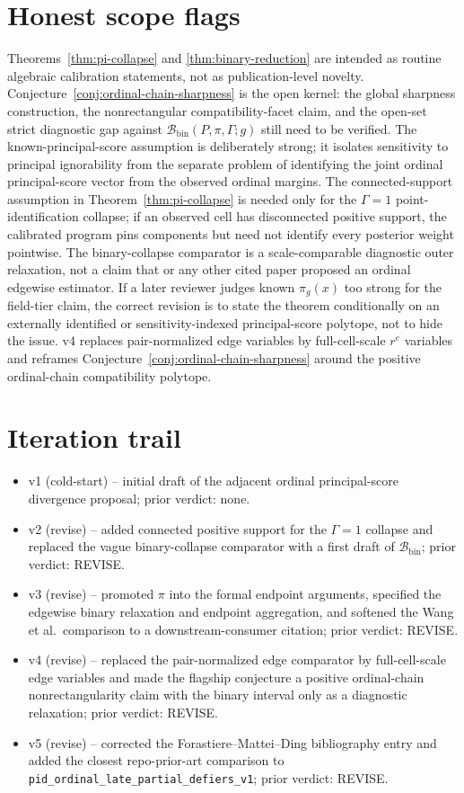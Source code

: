 \documentclass[11pt]{article}
\theoremstyle{definition}
\theoremstyle{plain}
\theoremstyle{remark}
\begin{document}
\section{Honest scope flags}
Theorems~\ref{thm:pi-collapse} and \ref{thm:binary-reduction} are intended as routine algebraic calibration statements, not as publication-level novelty.  Conjecture~\ref{conj:ordinal-chain-sharpness} is the open kernel: the global sharpness construction, the nonrectangular compatibility-facet claim, and the open-set strict diagnostic gap against \(\mathcal B_{\mathrm{bin}}(P,\pi,\Gamma;g)\) still need to be verified.  The known-principal-score assumption is deliberately strong; it isolates sensitivity to principal ignorability from the separate problem of identifying the joint ordinal principal-score vector from the observed ordinal margins.  The connected-support assumption in Theorem~\ref{thm:pi-collapse} is needed only for the \(\Gamma=1\) point-identification collapse; if an observed cell has disconnected positive support, the calibrated program pins components but need not identify every posterior weight pointwise.  The binary-collapse comparator is a scale-comparable diagnostic outer relaxation, not a claim that \citet{WangZhangMealliBornkamp2023} or any other cited paper proposed an ordinal edgewise estimator.  If a later reviewer judges known \(\pi_g(x)\) too strong for the field-tier claim, the correct revision is to state the theorem conditionally on an externally identified or sensitivity-indexed principal-score polytope, not to hide the issue.  v4 replaces pair-normalized edge variables by full-cell-scale \(r^e\) variables and reframes Conjecture~\ref{conj:ordinal-chain-sharpness} around the positive ordinal-chain compatibility polytope.

\section{Iteration trail}
\begin{itemize}[leftmargin=*]
\item v1 (cold-start) -- initial draft of the adjacent ordinal principal-score divergence proposal; prior verdict: none.
\item v2 (revise) -- added connected positive support for the \(\Gamma=1\) collapse and replaced the vague binary-collapse comparator with a first draft of \(\mathcal B_{\mathrm{bin}}\); prior verdict: REVISE.
\item v3 (revise) -- promoted \(\pi\) into the formal endpoint arguments, specified the edgewise binary relaxation and endpoint aggregation, and softened the Wang et al.\ comparison to a downstream-consumer citation; prior verdict: REVISE.
\item v4 (revise) -- replaced the pair-normalized edge comparator by full-cell-scale edge variables and made the flagship conjecture a positive ordinal-chain nonrectangularity claim with the binary interval only as a diagnostic relaxation; prior verdict: REVISE.
\item v5 (revise) -- corrected the Forastiere--Mattei--Ding bibliography entry and added the closest repo-prior-art comparison to \texttt{pid\_ordinal\_late\_partial\_defiers\_v1}; prior verdict: REVISE.
\end{itemize}
\end{document}
